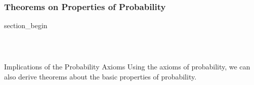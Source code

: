 \subsubsection{Theorems on Properties of Probability}
\begin{frame} \vfill \centering \begin{beamercolorbox}[sep=10pt,center,shadow=false,rounded=true]{section_begin} \insertsubsubsectionhead\par \end{beamercolorbox} \vfill \end{frame}

\begin{frame}[t]
\frametitle{\ }
    \begin{block}{Implications of the Probability Axioms}
        Using the axioms of probability, we can also derive theorems about the basic properties of probability.
    \end{block}
\end{frame}

